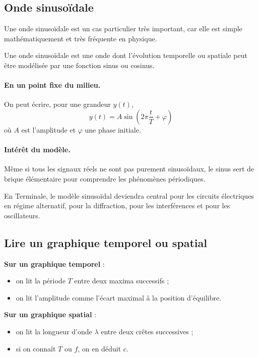 \documentclass[11pt,a4paper]{article}
\begin{document}
\subsection{Onde sinusoïdale}
Une onde sinusoïdale est un cas particulier très important, car elle est simple mathématiquement et très fréquente en physique.

\begin{definitionbox}
Une onde sinusoïdale est une onde dont l'évolution temporelle ou spatiale peut être modélisée par une fonction sinus ou cosinus.
\end{definitionbox}

\paragraph{En un point fixe du milieu.}
On peut écrire, pour une grandeur $y(t)$,
\[
y(t)=A\sin\left(2\pi \frac{t}{T}+\varphi\right)
\]
où $A$ est l'amplitude et $\varphi$ une phase initiale.

\paragraph{Intérêt du modèle.}
Même si tous les signaux réels ne sont pas purement sinusoïdaux, le sinus sert de brique élémentaire pour comprendre les phénomènes périodiques.

\begin{ouverture}
En Terminale, le modèle sinusoïdal deviendra central pour les circuits électriques en régime alternatif, pour la diffraction, pour les interférences et pour les oscillateurs.
\end{ouverture}

\subsection{Lire un graphique temporel ou spatial}

\begin{methode}
\textbf{Sur un graphique temporel} :
\begin{itemize}
    \item on lit la période $T$ entre deux maxima successifs ;
    \item on lit l'amplitude comme l'écart maximal à la position d'équilibre.
\end{itemize}
\textbf{Sur un graphique spatial} :
\begin{itemize}
    \item on lit la longueur d'onde $\lambda$ entre deux crêtes successives ;
    \item si on connaît $T$ ou $f$, on en déduit $c$.
\end{itemize}
\end{methode}
\end{document}
